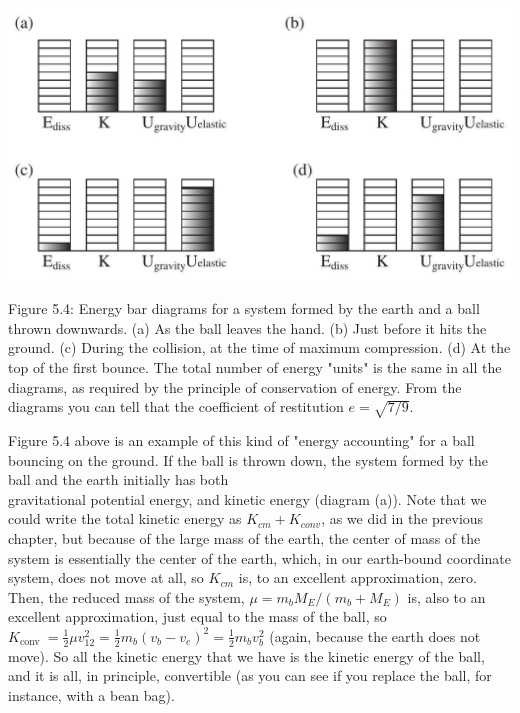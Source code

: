 \documentclass[10pt]{article}
\begin{document}
\begin{center}
\includegraphics[max width=\textwidth]{2024_09_14_9969b06773f10b6936e8g-118}
\end{center}

Figure 5.4: Energy bar diagrams for a system formed by the earth and a ball thrown downwards. (a) As the ball leaves the hand. (b) Just before it hits the ground. (c) During the collision, at the time of maximum compression. (d) At the top of the first bounce. The total number of energy "units" is the same in all the diagrams, as required by the principle of conservation of energy. From the diagrams you can tell that the coefficient of restitution $e=\sqrt{7 / 9}$.

Figure 5.4 above is an example of this kind of "energy accounting" for a ball bouncing on the ground. If the ball is thrown down, the system formed by the ball and the earth initially has both\\
gravitational potential energy, and kinetic energy (diagram (a)). Note that we could write the total kinetic energy as $K_{c m}+K_{c o n v}$, as we did in the previous chapter, but because of the large mass of the earth, the center of mass of the system is essentially the center of the earth, which, in our earth-bound coordinate system, does not move at all, so $K_{c m}$ is, to an excellent approximation, zero. Then, the reduced mass of the system, $\mu=m_{b} M_{E} /\left(m_{b}+M_{E}\right)$ is, also to an excellent approximation, just equal to the mass of the ball, so $K_{\text {conv }}=\frac{1}{2} \mu v_{12}^{2}=\frac{1}{2} m_{b}\left(v_{b}-v_{e}\right)^{2}=\frac{1}{2} m_{b} v_{b}^{2}$ (again, because the earth does not move). So all the kinetic energy that we have is the kinetic energy of the ball, and it is all, in principle, convertible (as you can see if you replace the ball, for instance, with a bean bag).
\end{document}
